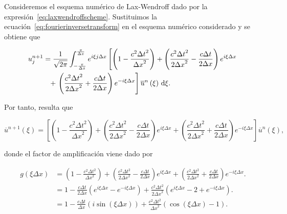 \begin{example}
  Consideremos el esquema numérico de Lax-Wendroff dado por la
  expresión~\eqref{eq:laxwendroffscheme}.
  Sustituimos la ecuación~\eqref{eq:fourierinversetransform} en el
  esquema numérico considerado y se obtiene que

  \begin{gather*}
    \begin{split}
      u^{n+1}_{j}
       & =
      \frac{1}{\sqrt{2\pi}}
      \int_{-\frac{\pi}{\Delta x}}^{\frac{\pi}{\Delta x}}
      e^{i\xi j\Delta x}
      \left[
        \left(
        1-
        \frac{c^{2}{\Delta t}^{2}}{{\Delta x}^{2}}
        \right)+
        \left(
        \frac{c^{2}{\Delta t}^{2}}{2{\Delta x}^{2}}-
        \frac{c\Delta t}{2\Delta x}
        \right)
      e^{i\xi\Delta x}\right. \\
       & \phantom{=}
        +\left.
        \left(
        \frac{c^{2}{\Delta t}^{2}}{2{\Delta x}^{2}}+
        \frac{c\Delta t}{2\Delta x}
        \right)
        e^{-i\xi\Delta x}
        \right]
      \overline{u}^{n}
      \left(\xi\right)\dl\xi.
    \end{split}
  \end{gather*}

  Por tanto, resulta que

  \begin{equation*}
    \overline{u}^{n+1}
    \left(\xi\right)=
    \left[
      \left(
      1-
      \frac{c^{2}{\Delta t}^{2}}{{\Delta x}^{2}}
      \right)+
      \left(
      \frac{c^{2}{\Delta t}^{2}}{2{\Delta x}^{2}}-
      \frac{c\Delta t}{2\Delta x}
      \right)
      e^{i\xi\Delta x}+
      \left(
      \frac{c^{2}{\Delta t}^{2}}{2{\Delta x}^{2}}+
      \frac{c\Delta t}{2\Delta x}
      \right)
      e^{-i\xi\Delta x}
      \right]
    \overline{u}^{n}
    \left(\xi\right),
  \end{equation*}

  donde el factor de amplificación viene dado por

  \begin{align*}
    g
    \left(\xi\Delta x\right) & =
    \left(
    1-
    \frac{c^{2}{\Delta t}^{2}}{{\Delta x}^{2}}
    \right)+
    \left(
    \frac{c^{2}{\Delta t}^{2}}{2{\Delta x}^{2}}-
    \frac{c\Delta t}{2\Delta x}
    \right)
    e^{i\xi\Delta x}+
    \left(
    \frac{c^{2}{\Delta t}^{2}}{2{\Delta x}^{2}}+
    \frac{c\Delta t}{2\Delta x}
    \right)
    e^{-i\xi\Delta x}.           \\
                             & =
    1-
    \frac{c\Delta t}{2\Delta x}
    \left(e^{i\xi\Delta x}-
    e^{-i\xi\Delta x}\right)+
    \frac{c^{2}{\Delta t}^{2}}{2{\Delta x}^{2}}
    \left(e^{i\xi\Delta x}-
    2+
    e^{-i\xi\Delta x}\right).    \\
                             & =
    1-\frac{c\Delta t}{\Delta x}
    \left(
    i\sin
    \left(\xi\Delta x\right)
    \right)+
    \frac{c^{2}{\Delta t}^{2}}{{\Delta x}^{2}}
    \left(
    \cos
    \left(\xi\Delta x\right)-
    1
    \right).
  \end{align*}


\end{example}
